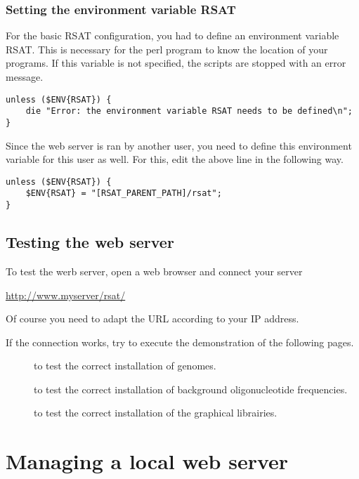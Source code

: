 \documentclass[12pt,a4paper, twoside]{scrreprt} %
\begin{document}
\subsubsection{Setting the environment variable RSAT}

For the basic RSAT configuration, you had to define an environment
variable RSAT. This is necessary for the perl program to know the
location of your programs. If this variable is not specified, the
scripts are stopped with an error message.

\begin{lstlisting}
unless ($ENV{RSAT}) {
    die "Error: the environment variable RSAT needs to be defined\n";
}
\end{lstlisting}

Since the web server is ran by another user, you need to define this
environment variable for this user as well. For this, edit the
above line in the following way.

\begin{lstlisting}
unless ($ENV{RSAT}) {
    $ENV{RSAT} = "[RSAT_PARENT_PATH]/rsat";
}
\end{lstlisting}


\subsection{Testing the web server}

To test the werb server, open a web browser and connect your \RSAT server

\url{http://www.myserver/rsat/} 

Of course you  need to adapt the URL according to your IP address.

If the connection works, try to execute the demonstration of the
following pages.

\begin{description}
\item[] to test the correct installation of genomes. 

\item[] to test the correct installation of
background oligonucleotide frequencies.

\item[] to test the correct installation of the
graphical librairies.

\end{description}

\section{Managing a local web server}
\end{document}
